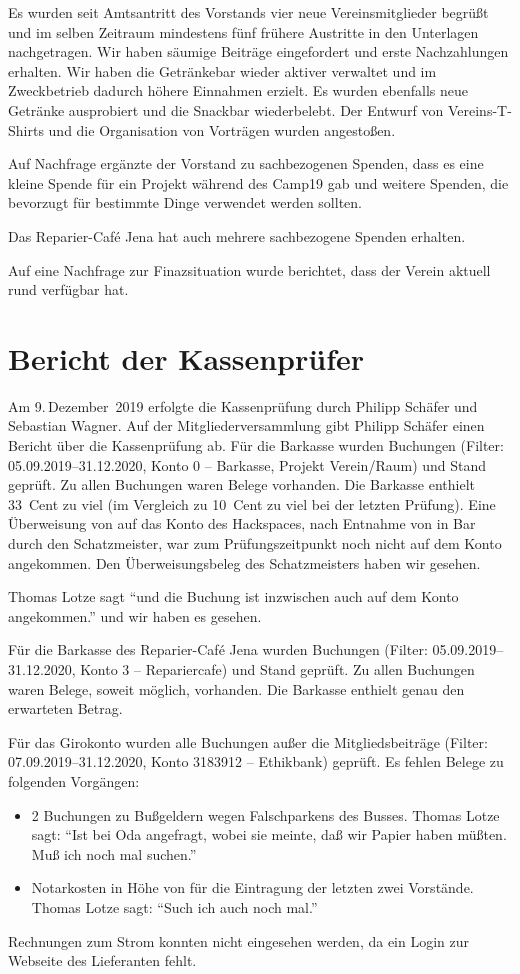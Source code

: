 \documentclass[DIV=calc,parksip=half*]{scrartcl}
\newcommand{\fiveop}{Philipp Schäfer}
\newcommand{\thomas}{Thomas Lotze}
\newcommand{\ckv}{Sebastian Wagner}
\begin{document}
Es wurden seit Amtsantritt des Vorstands vier neue Vereinsmitglieder begrüßt und im selben Zeitraum mindestens fünf frühere Austritte in den Unterlagen nachgetragen. Wir haben säumige Beiträge eingefordert und erste Nachzahlungen erhalten.
Wir haben die Getränkebar wieder aktiver verwaltet und im Zweckbetrieb dadurch höhere Einnahmen erzielt. Es wurden ebenfalls neue Getränke ausprobiert und die Snackbar wiederbelebt.
Der Entwurf von Vereins-T-Shirts und die Organisation von Vorträgen wurden angestoßen.

Auf Nachfrage ergänzte der Vorstand zu sachbezogenen Spenden, dass es eine kleine Spende für ein Projekt während des Camp19 gab und weitere Spenden, die bevorzugt für bestimmte Dinge verwendet werden sollten.

Das  Reparier-Café Jena hat auch mehrere sachbezogene Spenden erhalten.

Auf eine Nachfrage zur Finazsituation wurde berichtet, dass der Verein aktuell rund  verfügbar hat.

\section{Bericht der Kassenprüfer}

Am 9.\,Dezember~2019 erfolgte die Kassenprüfung durch \fiveop{} und  \ckv. Auf der
Mitgliederversammlung gibt \fiveop{} einen Bericht über die Kassenprüfung ab. Für die Barkasse wurden Buchungen (Filter: 
05.09.2019--31.12.2020, Konto 0 -- Barkasse, Projekt Verein/Raum) und Stand geprüft. Zu allen Buchungen waren Belege vorhanden. Die Barkasse enthielt 33~Cent zu viel (im Vergleich zu 10~Cent
zu viel bei der letzten Prüfung). Eine Überweisung von  auf das Konto des Hackspaces, nach Entnahme von  in Bar durch den Schatzmeister, war zum Prüfungszeitpunkt noch nicht auf dem Konto angekommen. Den Überweisungsbeleg des Schatzmeisters haben wir gesehen.

\thomas{} sagt \enquote{und die Buchung ist inzwischen auch auf dem Konto angekommen.} und wir haben es gesehen.

Für die Barkasse des Reparier-Café Jena wurden Buchungen (Filter:
05.09.2019--31.12.2020, Konto 3 -- Repariercafe) und Stand geprüft.
Zu allen Buchungen waren Belege, soweit möglich, vorhanden. Die Barkasse enthielt genau den erwarteten Betrag.


Für das Girokonto wurden alle Buchungen außer die Mitgliedsbeiträge (Filter:
07.09.2019--31.12.2020, Konto 3183912 -- Ethikbank) geprüft. Es fehlen Belege zu
folgenden Vorgängen:
\begin{itemize}
 \item 2 Buchungen zu Bußgeldern wegen Falschparkens des Busses.
 \thomas{} sagt: \enquote{Ist bei Oda angefragt, wobei sie meinte, daß wir Papier haben müßten. Muß ich noch mal suchen.}
 
 \item Notarkosten in Höhe von  für die Eintragung der letzten zwei Vorstände. \thomas{} sagt: \enquote{Such ich auch noch mal.}
\end{itemize}
Rechnungen zum Strom konnten nicht eingesehen werden, da ein Login zur Webseite des Lieferanten fehlt.
\end{document}
